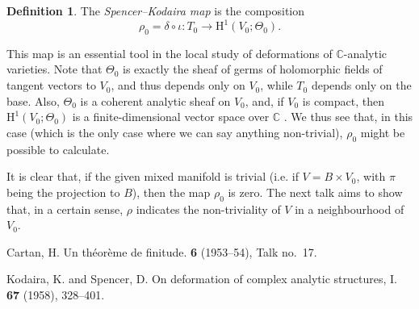 \documentclass{article}
\theoremstyle{plain}
\theoremstyle{definition}
\newtheorem*{definition*}{Definition}
\newcommand{\CC}{\mathbb{C}}
\newcommand{\HH}{\mathrm{H}}
\begin{document}
\begin{definition*}
  The \emph{Spencer--Kodaira map} is the composition
  \[
    \rho_0 = \delta\circ\iota\colon T_0 \to \HH^1(V_0;\Theta_0).
  \]
\end{definition*}

This map is an essential tool in the local study of deformations of $\CC$-analytic varieties.
Note that $\Theta_0$ is exactly the sheaf of germs of holomorphic fields of tangent vectors to $V_0$, and thus depends only on $V_0$, while $T_0$ depends only on the base.
Also, $\Theta_0$ is a coherent analytic sheaf on $V_0$, and, if $V_0$ is compact, then $\HH^1(V_0;\Theta_0)$ is a finite-dimensional vector space over $\CC$ \cite{1}.
We thus see that, in this case (which is the only case where we can say anything non-trivial), $\rho_0$ might be possible to calculate.

It is clear that, if the given mixed manifold is trivial (i.e. if $V=B\times V_0$, with $\pi$ being the projection to $B$), then the map $\rho_0$ is zero.
The next talk aims to show that, in a certain sense, $\rho$ indicates the non-triviality of $V$ in a neighbourhood of $V_0$.






\nocite{*}

\begin{thebibliography}{2}

  {\sc Cartan, H.}
  \newblock Un th\'{e}or\`{e}me de finitude.
   \textbf{6} (1953--54), Talk no.~17.

  {\sc Kodaira, K. and Spencer, D.}
  \newblock On deformation of complex analytic structures, I.
   \textbf{67} (1958), 328--401.

\end{thebibliography}
\end{document}
